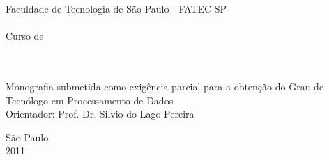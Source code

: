 \thispagestyle{empty}

\begin{center}
Faculdade de Tecnologia de São Paulo - FATEC-SP \\
\DTI \\
Curso de \PD \\
\vspace{2.5cm}
\TITLE \\
\vspace{2.5cm}
\large \BBC \\
\vspace{3cm}
\hspace{7cm} \begin{minipage}{0.5\textwidth}
Monografia submetida como exigência
parcial para a obtenção do Grau de
Tecnólogo em Processamento de Dados \\
Orientador: Prof. Dr. Silvio do Lago Pereira
\end{minipage}
\vspace{4cm}

\large São Paulo \\ 2011
\end{center}
